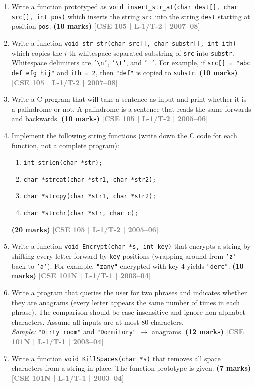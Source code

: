 \documentclass[12pt,a3paper]{article}
\newcommand{\yr}[1]{\hfill\textcolor{gray}{\small\textbf{[#1]}}}
\newcommand{\mk}[1]{\textcolor{orange!70!black}{\small\textbf{(#1 marks)}}}
\begin{document}
\begin{enumerate}
\item Write a function prototyped as \texttt{void insert\_str\_at(char dest[], char src[], int pos)} which inserts the string \texttt{src} into the string \texttt{dest} starting at position \texttt{pos}.
\mk{10} \yr{CSE 105 | L-1/T-2 | 2007--08}

\item Write a function \texttt{void str\_str(char src[], char substr[], int ith)} which copies the $i$-th whitespace-separated substring of \texttt{src} into \texttt{substr}. Whitespace delimiters are \texttt{'\textbackslash n'}, \texttt{'\textbackslash t'}, and \texttt{' '}. For example, if \texttt{src[] = "abc def efg hij"} and \texttt{ith = 2}, then \texttt{"def"} is copied to \texttt{substr}.
\mk{10} \yr{CSE 105 | L-1/T-2 | 2007--08}

\item Write a C program that will take a sentence as input and print whether it is a palindrome or not. A palindrome is a sentence that reads the same forwards and backwards.
\mk{10} \yr{CSE 105 | L-1/T-2 | 2005--06}

\item Implement the following string functions (write down the C code for each function, not a complete program):
\begin{enumerate}
  \item \texttt{int strlen(char *str);}
  \item \texttt{char *strcat(char *str1, char *str2);}
  \item \texttt{char *strcpy(char *str1, char *str2);}
  \item \texttt{char *strchr(char *str, char c);}
\end{enumerate}
\mk{20} \yr{CSE 105 | L-1/T-2 | 2005--06}

\item Write a function \texttt{void Encrypt(char *s, int key)} that encrypts a string by shifting every letter forward by \texttt{key} positions (wrapping around from \texttt{'z'} back to \texttt{'a'}). For example, \texttt{"zany"} encrypted with key 4 yields \texttt{"derc"}.
\mk{10} \yr{CSE 101N | L-1/T-1 | 2003--04}

\item Write a program that queries the user for two phrases and indicates whether they are anagrams (every letter appears the same number of times in each phrase). The comparison should be case-insensitive and ignore non-alphabet characters. Assume all inputs are at most 80 characters.\\
\textit{Sample:} \texttt{"Dirty room"} and \texttt{"Dormitory"} $\to$ anagrams.
\mk{12} \yr{CSE 101N | L-1/T-1 | 2003--04}

\item Write a function \texttt{void KillSpaces(char *s)} that removes all space characters from a string in-place. The function prototype is given.
\mk{7} \yr{CSE 101N | L-1/T-1 | 2003--04}

\end{enumerate}
\end{document}
